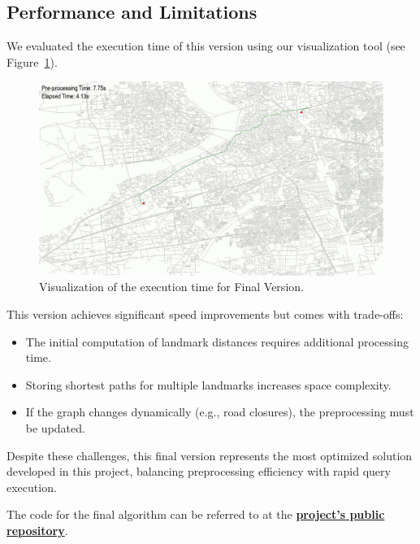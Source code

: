 	\subsection{Performance and Limitations}
	
	We evaluated the execution time of this version using our visualization tool (see Figure~\ref{fig:bidirectional_alt_timing}).
	
	\begin{figure}[h]
		\centering
		\includegraphics[width=1.0\textwidth]{final.png}
		\caption{Visualization of the execution time for Final Version.}
		\label{fig:bidirectional_alt_timing}
	\end{figure}
	
	This version achieves significant speed improvements but comes with trade-offs:
	\begin{itemize}
		\item The initial computation of landmark distances requires additional processing time.
		\item Storing shortest paths for multiple landmarks increases space complexity.
		\item If the graph changes dynamically (e.g., road closures), the preprocessing must be updated.
	\end{itemize}
	
	Despite these challenges, this final version represents the most optimized solution developed in this project, balancing preprocessing efficiency with rapid query execution. \vspace{4mm}
	
	The code for the final algorithm can be referred to at the \textcolor{blue}{{\href{https://github.com/Chand-ra/Mini-Project/blob/master/code/algorithms.py}{\textbf{project's public repository}}}}.